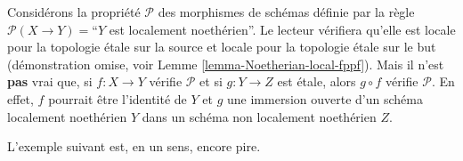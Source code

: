 \begin{example}
\label{example-silly-one}
Considérons la propriété $\mathcal{P}$ des morphismes de schémas définie par
la règle $\mathcal{P}(X \to Y) = $``$Y$ est localement noethérien''.
Le lecteur vérifiera qu'elle est locale pour la topologie \'etale sur la
source et locale pour la topologie \'etale sur le but (démonstration omise,
voir Lemme \ref{lemma-Noetherian-local-fppf}).
Mais il n'est {\bf pas} vrai que, si $f : X \to Y$ vérifie $\mathcal{P}$
et si $g : Y \to Z$ est \'etale, alors $g \circ f$ vérifie $\mathcal{P}$.
En effet, $f$ pourrait être l'identité de $Y$ et $g$ une immersion ouverte
d'un schéma localement noethérien $Y$ dans un schéma non localement
noethérien $Z$.
\end{example}

\noindent
L'exemple suivant est, en un sens, encore pire.

